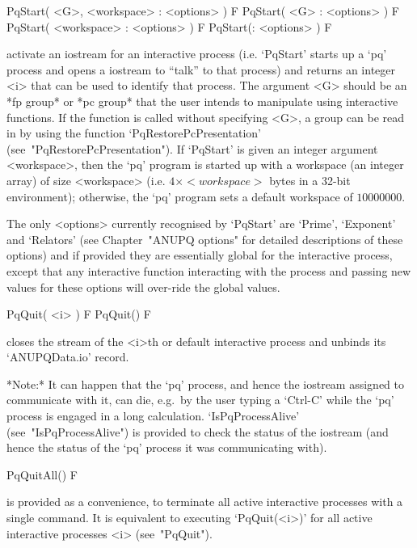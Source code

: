 
\>PqStart( <G>, <workspace> : <options> ) F
\>PqStart( <G> : <options> ) F
\>PqStart( <workspace> : <options> ) F
\>PqStart(: <options> ) F

activate an iostream for an interactive {\ANUPQ} process (i.e.  `PqStart'
starts up a `pq' process and  opens a {\GAP} iostream to ``talk'' to that
process) and  returns an integer  <i> that can  be used to  identify that
process.  The argument <G> should be an *fp group* or *pc group* that the
user intends to manipulate  using interactive {\ANUPQ} functions.  If the
function is  called without  specifying <G>,  a group can  be read  in by
using the function `PqRestorePcPresentation' (see~"PqRestorePcPresentation").
If `PqStart' is given an integer  argument  <workspace>,  then  the  `pq'
program is started up  with  a  workspace  (an  integer  array)  of  size
<workspace> (i.e. $4 \times <workspace>$ bytes in a 32-bit  environment);
otherwise, the `pq' program sets a default workspace of $10000000$.

The  only  <options>  currently  recognised  by  `PqStart'  are  `Prime',
`Exponent' and  `Relators'  (see  Chapter~"ANUPQ  options"  for  detailed
descriptions of these options)  and  if  provided  they  are  essentially
global for the interactive {\ANUPQ} process, except that any  interactive
function interacting with the process and passing new  values  for  these
options will over-ride the global values.

\>PqQuit( <i> ) F
\>PqQuit() F

closes the stream of the <i>th or default  interactive  {\ANUPQ}  process
and unbinds its `ANUPQData.io' record.

*Note:*
It can happen that the  `pq'  process,  and  hence  the  {\GAP}  iostream
assigned to communicate with it, can  die,  e.g.~by  the  user  typing  a
`Ctrl-C' while the  `pq'  process  is  engaged  in  a  long  calculation.
`IsPqProcessAlive' (see~"IsPqProcessAlive")  is  provided  to  check  the
status of the {\GAP} iostream (and hence the status of the  `pq'  process
it was communicating with).

\>PqQuitAll() F

is provided  as  a  convenience,  to  terminate  all  active  interactive
{\ANUPQ} processes with a single command. It is equivalent  to  executing
`PqQuit(<i>)'  for  all  active  interactive   {\ANUPQ}   processes   <i>
(see~"PqQuit").

